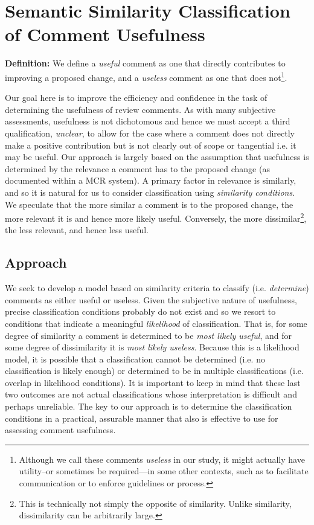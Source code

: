 
\section{Semantic Similarity Classification of Comment Usefulness}

\textbf{Definition:} We define a \emph{useful} comment as one that directly contributes to improving a proposed change, and a \emph{useless} comment as one that does not\footnote{Although we call these comments \emph{useless} in our study, it might actually have utility--or sometimes  be required---in some other contexts, such as to facilitate communication or to enforce guidelines or process.}.

Our goal here is to improve the efficiency and confidence in the task of determining the usefulness of review comments.
As with many subjective assessments, usefulness is not dichotomous and hence we must accept a third qualification, \emph{unclear}, to allow for the case where a comment does not directly make a positive contribution but is not clearly out of scope or tangential i.e. it may be useful.
Our approach is largely based on the assumption that usefulness is determined by the relevance a comment has to the proposed change (as documented within a MCR system).
A primary factor in relevance is similarly, and so it is natural for us to consider classification using \emph{similarity conditions}. 
We speculate that the more similar a comment is to the proposed change, the more relevant it is and hence more likely useful.
Conversely, the more dissimilar\footnote{This is technically not simply the opposite of similarity. Unlike similarity, dissimilarity can be arbitrarily large.}, the less relevant, and hence less useful.

\subsection{Approach}
We seek to develop a model based on similarity criteria to classify (i.e. \emph{determine}) comments as either useful or useless. 
Given the subjective nature of usefulness, precise classification conditions probably do not exist and so we resort to conditions that indicate a meaningful \emph{likelihood} of classification.
That is, for some degree of similarity a comment is determined to be \emph{most likely useful}, and for some degree of dissimilarity it is \emph{most likely useless}. Because this is a likelihood model, it is possible that a classification cannot be determined (i.e. no classification is likely enough) or determined to be in multiple classifications (i.e. overlap in likelihood conditions). It is important to keep in mind that these last two outcomes are not actual classifications whose interpretation is difficult and perhaps unreliable.     
The key to our approach is to determine the classification conditions in a practical, assurable manner that also is effective to use for assessing comment usefulness.

